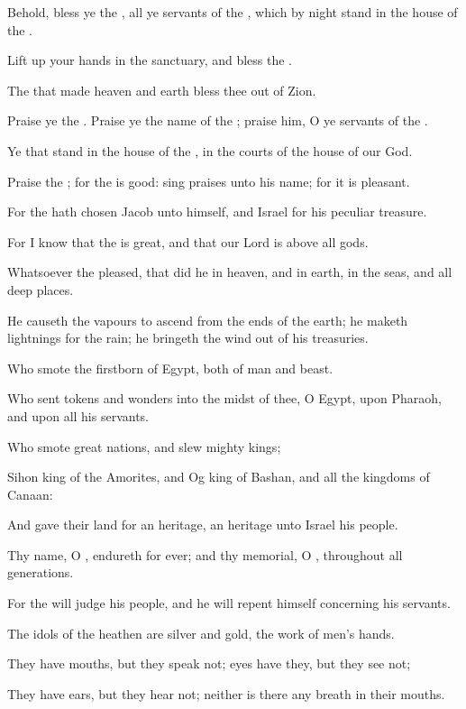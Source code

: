 \Chapter
\Verse Behold, bless ye the \LORD, all ye servants of the \LORD, which by night stand in the house of the \LORD.

\Verse Lift up your hands in the sanctuary, and bless the \LORD.

\Verse The \LORD that made heaven and earth bless thee out of Zion.




\Chapter
\Verse Praise ye the \LORD. Praise ye the name of the \LORD; praise him, O ye servants of the \LORD.

\Verse Ye that stand in the house of the \LORD, in the courts of the house of our God.

\Verse Praise the \LORD; for the \LORD is good: sing praises unto his name; for it is pleasant.

\Verse For the \LORD hath chosen Jacob unto himself, and Israel for his peculiar treasure.

\Verse For I know that the \LORD is great, and that our Lord is above all gods.

\Verse Whatsoever the \LORD pleased, that did he in heaven, and in earth, in the seas, and all deep places.

\Verse He causeth the vapours to ascend from the ends of the earth; he maketh lightnings for the rain; he bringeth the wind out of his treasuries.

\Verse Who smote the firstborn of Egypt, both of man and beast.

\Verse Who sent tokens and wonders into the midst of thee, O Egypt, upon Pharaoh, and upon all his servants.

\Verse Who smote great nations, and slew mighty kings;

\Verse Sihon king of the Amorites, and Og king of Bashan, and all the kingdoms of Canaan:

\Verse And gave their land for an heritage, an heritage unto Israel his people.

\Verse Thy name, O \LORD, endureth for ever; and thy memorial, O \LORD, throughout all generations.

\Verse For the \LORD will judge his people, and he will repent himself concerning his servants.

\Verse The idols of the heathen are silver and gold, the work of men's hands.

\Verse They have mouths, but they speak not; eyes have they, but they see not;

\Verse They have ears, but they hear not; neither is there any breath in their mouths.

